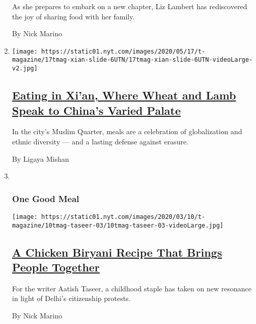 \begin{enumerate}
  As she prepares to embark on a new chapter, Liz Lambert has
  rediscovered the joy of sharing food with her family.

  By Nick Marino
\item
  \texttt{[image: https://static01.nyt.com/images/2020/05/17/t-magazine/17tmag-xian-slide-6UTN/17tmag-xian-slide-6UTN-videoLarge-v2.jpg]}

  \hypertarget{eating-in-xian-where-wheat-and-lamb-speak-to-chinas-varied-palate}{%
  \subsection{\texorpdfstring{\href{/2020/05/11/t-magazine/xian-china-food.html}{Eating
  in Xi'an, Where Wheat and Lamb Speak to China's Varied
  Palate}}{Eating in Xi'an, Where Wheat and Lamb Speak to China's Varied Palate}}\label{eating-in-xian-where-wheat-and-lamb-speak-to-chinas-varied-palate}}

  In the city's Muslim Quarter, meals are a celebration of globalization
  and ethnic diversity --- and a lasting defense against erasure.

  By Ligaya Mishan
\item ~
  \hypertarget{one-good-meal-3}{%
  \subsubsection{One Good Meal}\label{one-good-meal-3}}

  \texttt{[image: https://static01.nyt.com/images/2020/03/10/t-magazine/10tmag-taseer-03/10tmag-taseer-03-videoLarge.jpg]}

  \hypertarget{a-chicken-biryani-recipe-that-brings-people-together}{%
  \subsection{\texorpdfstring{\href{/2020/03/10/t-magazine/aatish-taseer-chicken-biryani.html}{A
  Chicken Biryani Recipe That Brings People
  Together}}{A Chicken Biryani Recipe That Brings People Together}}\label{a-chicken-biryani-recipe-that-brings-people-together}}

  For the writer Aatish Taseer, a childhood staple has taken on new
  resonance in light of Delhi's citizenship protests.

  By Nick Marino
\end{enumerate}

